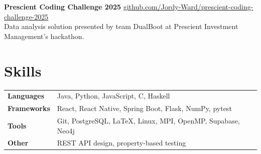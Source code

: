 \documentclass[11pt, a4paper]{article}
\begin{document}
\textbf{Prescient Coding Challenge 2025} \hfill \href{https://github.com/Jordy-Ward/prescient-coding-challenge-2025}{github.com/Jordy-Ward/prescient-coding-challenge-2025} \\
Data analysis solution presented by team DualBoot at Prescient Investment Management's hackathon.

\section{Skills}

\begin{tabular}{@{} l l}
  \textbf{Languages}  & Java, Python, JavaScript, C, Haskell \\
  \textbf{Frameworks} & React, React Native, Spring Boot, Flask, NumPy, pytest \\
  \textbf{Tools}      & Git, PostgreSQL, LaTeX, Linux, MPI, OpenMP, Supabase, Neo4j \\
  \textbf{Other}      & REST API design, property-based testing \\

\end{tabular}
\end{document}
